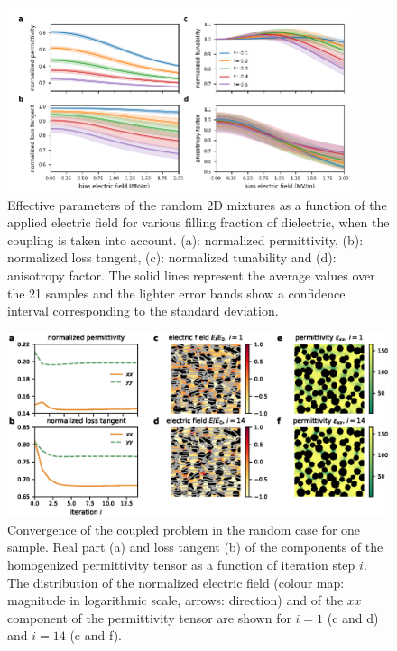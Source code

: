 \documentclass[openacc]{rsproca_new}%
\begin{document}
\begin{figure}[!t]
 \centering
 \includegraphics[width=0.9\textwidth]{effpar_rand_cpl}
 \caption{Effective parameters of the random 2D mixtures as a function of the
  applied electric field for various filling fraction of dielectric, when the
  coupling is taken into account.
  (a): normalized permittivity, (b): normalized loss tangent, (c): normalized tunability and
  (d): anisotropy factor. The solid lines represent the average values
  over the 21 samples and the lighter error bands show a confidence interval corresponding to
  the standard deviation.}
 \label{eff_par_2Drand_TM}
\end{figure}
%
%
%
\begin{figure}[!t]
 \centering
 \includegraphics[width=1\textwidth]{conv_rand}
 \caption{Convergence of the coupled problem in the random case
  for one sample.
  Real part (a) and loss tangent (b) of the components of the homogenized
  permittivity tensor as a function of iteration step $i$. The distribution of
  the normalized electric field (colour map: magnitude in logarithmic scale, arrows: direction) and of the
  $xx$ component of the permittivity tensor are shown for $i=1$
  (c and d) and $i=14$ (e and f).
 }
 \label{conv_random}
\end{figure}
\end{document}
